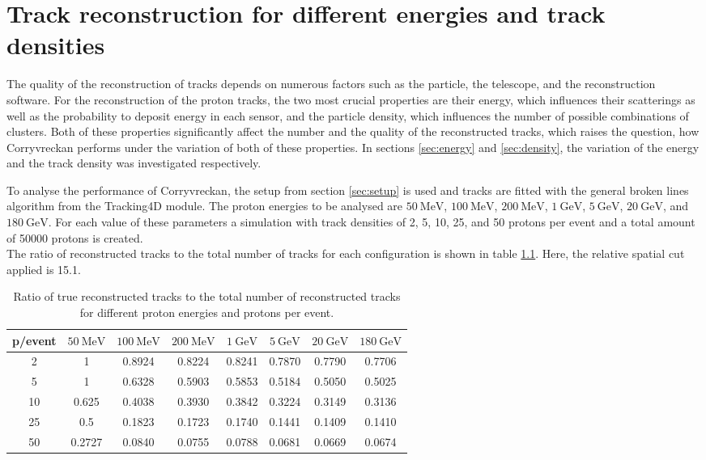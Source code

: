 \chapter{Track reconstruction for different energies and track densities}
The quality of the reconstruction of tracks depends on numerous factors such as the particle, the telescope, and the reconstruction software.
For the reconstruction of the proton tracks, the two most crucial properties are their energy, which influences their scatterings as well as the probability to deposit
energy in each sensor, and the particle density, which influences the number of possible combinations of clusters.
Both of these properties significantly affect the number and the quality of the reconstructed tracks, which raises the question, how Corryvreckan performs
under the variation of both of these properties.
In sections \ref{sec:energy} and \ref{sec:density}, the variation of the energy and the track density was investigated respectively.

To analyse the performance of Corryvreckan, the setup from section \ref{sec:setup} is used and tracks are fitted with the general broken lines algorithm
from the Tracking4D module.
The proton energies to be analysed are $\SI{50}{\mega\eV}$, $\SI{100}{\mega\eV}$, $\SI{200}{\mega\eV}$,
$\SI{1}{\giga\eV}$, $\SI{5}{\giga\eV}$, $\SI{20}{\giga\eV}$, and $\SI{180}{\giga\eV}$. For each value of these parameters a simulation with track densities
of 2, 5, 10, 25, and 50 protons per event and a total amount of 50000 protons is created. \\
The ratio of reconstructed tracks to the total number of tracks for each configuration is shown in table \ref{tab:study}. Here, the relative spatial cut applied is 15.1.


\begin{table}
  \centering
  \begin{tabular}{c | c c c c c c c}
    \toprule
     p/event &  $\SI{50}{\mega\eV}$ & $\SI{100}{\mega\eV}$ & $\SI{200}{\mega\eV}$ & $\SI{1}{\giga\eV}$ & $\SI{5}{\giga\eV}$ & $\SI{20}{\giga\eV}$ & $\SI{180}{\giga\eV}$ \\
    \midrule
     2   & 1 & 0.8924 & 0.8224 & 0.8241 & 0.7870 & 0.7790 & 0.7706  \\
     5   & 1 & 0.6328 & 0.5903 & 0.5853 & 0.5184 & 0.5050 & 0.5025  \\
     10  & 0.625 & 0.4038 & 0.3930 & 0.3842 & 0.3224 & 0.3149 & 0.3136  \\
     25  & 0.5 & 0.1823 & 0.1723 & 0.1740 & 0.1441 & 0.1409 & 0.1410  \\
     50  & 0.2727 & 0.0840 & 0.0755 & 0.0788 & 0.0681 & 0.0669 & 0.0674  \\
  \end{tabular}
  \caption{Ratio of true reconstructed tracks to the total number of reconstructed tracks for different proton energies and protons per event.}
  \label{tab:study}
\end{table}

